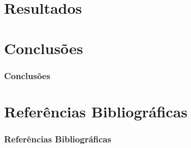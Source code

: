 \documentclass[12pt]{beamer}
\begin{document}
\section{Resultados}

%




\section{Conclusões}

\begin{frame}
\frametitle{Conclusões}

\end{frame}

\section{Referências Bibliográficas}

\begin{frame}
\frametitle{Referências Bibliográficas}







\end{frame}
\end{document}
